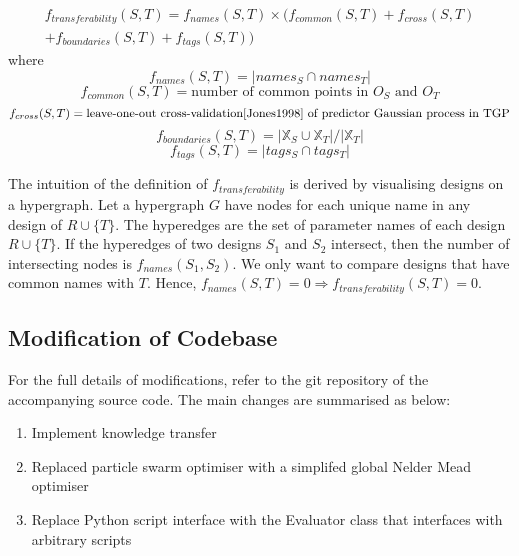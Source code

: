 \documentclass[10pt,a4paper]{article}
\begin{document}
\[
	\begin{split}
		f_{transferability}(S,T)=f_{names}(S,T)\times(f_{common}(S,T)+f_{cross}(S,T)\\
			+f_{boundaries}(S,T)+f_{tags}(S,T))
	\end{split}
\] where
\[f_{names}(S,T)=|names_S\cap names_T|\]
\[f_{common}(S,T)=\text{number of common points in $O_S$ and $O_T$}\]
\[f_{cross}(S,T)=\text{leave-one-out cross-validation\cite{Jones1998} of predictor Gaussian process in TGP}\]
\[f_{boundaries}(S,T)=|\mathbb{X}_S\cup\mathbb{X}_T|/|\mathbb{X}_T|\]
\[f_{tags}(S,T)=|tags_S\cap tags_T|\]

The intuition of the definition of $f_{transferability}$ is derived by visualising designs on a hypergraph. Let a hypergraph $G$ have nodes for each unique name in any design of $R\cup\{T\}$. The hyperedges are the set of parameter names of each design $R\cup\{T\}$. If the hyperedges of two designs $S_1$ and $S_2$ intersect, then the number of intersecting nodes is $f_{names}(S_1,S_2)$. We only want to compare designs that have common names with $T$. Hence, $f_{names}(S,T)=0\Rightarrow f_{transferability}(S,T)=0$.

\subsection{Modification of Codebase}

For the full details of modifications, refer to the git repository of the accompanying source code. The main changes are summarised as below:
\begin{enumerate}
	\item Implement knowledge transfer
	\item Replaced particle swarm optimiser with a simplifed global Nelder Mead optimiser\cite{Luersen2004}
	\item Replace Python script interface with the Evaluator class that interfaces with arbitrary scripts
\end{enumerate}
\end{document}
